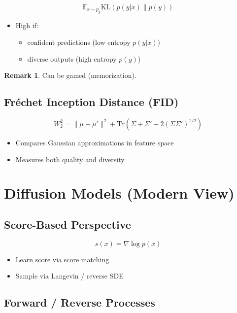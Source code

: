 \documentclass[12pt,oneside]{book}
\numberwithin{equation}{section}
\theoremstyle{definition}
\newtheorem{remark}{Remark}[section]
\theoremstyle{plain}
\theoremstyle{remark}
\begin{document}
\[
\mathbb{E}_{x \sim p_g} \mathrm{KL}(p(y|x)\|p(y))
\]

\begin{itemize}
    \item High if:
    \begin{itemize}
        \item confident predictions (low entropy $p(y|x)$)
        \item diverse outputs (high entropy $p(y)$)
    \end{itemize}
\end{itemize}

\begin{remark}
Can be gamed (memorization).
\end{remark}

\subsection{Fréchet Inception Distance (FID)}

\[
W_2^2 = \|\mu - \mu'\|^2 + \mathrm{Tr}(\Sigma + \Sigma' - 2(\Sigma\Sigma')^{1/2})
\]

\begin{itemize}
    \item Compares Gaussian approximations in feature space
    \item Measures both quality and diversity
\end{itemize}

\section{Diffusion Models (Modern View)}

\subsection{Score-Based Perspective}

\[
s(x) = \nabla \log p(x)
\]

\begin{itemize}
    \item Learn score via score matching
    \item Sample via Langevin / reverse SDE
\end{itemize}

\subsection{Forward / Reverse Processes}
\end{document}
